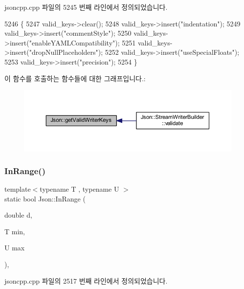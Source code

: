 jsoncpp.\+cpp 파일의 5245 번째 라인에서 정의되었습니다.


\begin{DoxyCode}
5246 \{
5247   valid\_keys->clear();
5248   valid\_keys->insert(\textcolor{stringliteral}{"indentation"});
5249   valid\_keys->insert(\textcolor{stringliteral}{"commentStyle"});
5250   valid\_keys->insert(\textcolor{stringliteral}{"enableYAMLCompatibility"});
5251   valid\_keys->insert(\textcolor{stringliteral}{"dropNullPlaceholders"});
5252   valid\_keys->insert(\textcolor{stringliteral}{"useSpecialFloats"});
5253   valid\_keys->insert(\textcolor{stringliteral}{"precision"});
5254 \}
\end{DoxyCode}
이 함수를 호출하는 함수들에 대한 그래프입니다.\+:\nopagebreak
\begin{figure}[H]
\begin{center}
\leavevmode
\includegraphics[width=350pt]{namespace_json_a77ffcc6bb405332d84c260d304d4384e_icgraph}
\end{center}
\end{figure}
\mbox{\label{namespace_json_aff0180507262a244de61b961178d7443}} 
\subsubsection{\texorpdfstring{In\+Range()}{InRange()}}
{\footnotesize\ttfamily template$<$typename T , typename U $>$ \\
static bool Json\+::\+In\+Range (\begin{DoxyParamCaption}\item[{double}]{d,  }\item[{T}]{min,  }\item[{U}]{max }\end{DoxyParamCaption})\hspace{0.3cm}{\ttfamily [inline]}, {\ttfamily [static]}}



jsoncpp.\+cpp 파일의 2517 번째 라인에서 정의되었습니다.


